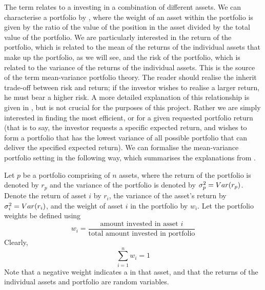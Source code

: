 The term  relates to a investing in a combination of different assets. We can characterise a portfolio by , where the weight of an asset within the portfolio is given by the ratio of the value of the position in the asset divided by the total value of the portfolio.
We are particularly interested in the return of the portfolio, which is related to the mean of the returns of the individual assets that make up the portfolio, as we will see, and the risk of the portfolio, which is related to the variance of the returns of the individual assets. This is the source of the term mean-variance portfolio theory.
The reader should realise the inherit trade-off between risk and return; if the investor wishes to realise a larger return, he must bear a higher risk. A more detailed explanation of this relationship is given in \cite{Lue98,Kuh12e}, but is not crucial for the purposes of this project.
Rather we are simply interested in finding the most efficient, or  for a given requested portfolio return (that is to say, the investor requests a specific expected return, and wishes to form a portfolio that has the lowest variance of all possible portfolio that can deliver the specified expected return).
We can formalise the mean-variance portfolio setting in the following way, which summarises the explanations from \cite{Onn02,Lue98,Kuh12e}.

Let $p$ be a portfolio comprising of $n$ assets, where the return of the portfolio is denoted by $r_{p}$ and the variance of the portfolio is denoted by $\sigma^{2}_{p} = Var(r_{p})$. Denote the return of asset $i$ by $r_{i}$, the variance of the asset's return by $\sigma^{2}_{i} = Var(r_{i})$, and the weight of asset $i$ in the portfolio by $w_{i}$.
Let the portfolio weights be defined using
\begin{equation}
	\label{eq:portfolioWeights}
	w_{i} = \frac{\text{amount invested in asset }i}{\text{total amount invested in portfolio}}
\end{equation}
Clearly,
\begin{equation}
	\label{eq:portfolioWeightsSum}
	\sum_{i=1}^{n} w_{i} = 1
\end{equation}
Note that a negative weight indicates a  in that asset, and that the returns of the individual assets and portfolio are random variables.


